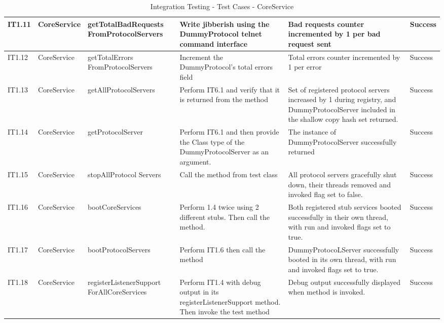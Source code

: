 \begin{table}[ht!]
\begin{tabular}{|m{0.5cm}|m{1.5cm}|m{1.5cm}|m{3cm}|m{3cm}|m{1.5cm}|}
IT1.11 & CoreService & getTotalBadRequests FromProtocolServers & Write jibberish using the DummyProtocol telnet command interface & Bad requests counter incremented by 1 per bad request sent & Success \\ \hline
IT1.12 & CoreService & getTotalErrors FromProtocolServers & Increment the DummyProtocol's total errors field & Total errors counter incremented by 1 per error & Success \\ \hline
IT1.13 & CoreService & getAllProtocolServers & Perform IT6.1 and verify that it is returned from the method & Set of registered protocol servers increased by 1 during registry, and DummyProtocolServer included in the shallow copy hash set returned. & Success \\ \hline
IT1.14 & CoreService & getProtocolServer & Perform IT6.1 and then provide the Class type of the DummyProtocolServer as an argument. & The instance of DummyProtocolServer successfully returned & Success \\ \hline
IT1.15 & CoreService & stopAllProtocol Servers & Call the method from test class & All protocol servers gracefully shut down, their threads removed and invoked flag set to false. & Success \\ \hline
IT1.16 & CoreService & bootCoreServices & Perform 1.4 twice using 2 different stubs. Then call the method. & Both registered stub services booted successfully in their own thread, with run and invoked flags set to true. & Success \\ \hline
IT1.17 & CoreService & bootProtocolServers & Perform IT1.6 then call the method & DummyProtocoLServer successfully booted in its own thread, with run and invoked flags set to true. & Success \\ \hline
IT1.18 & CoreService & registerListenerSupport ForAllCoreServices & Perform IT1.4 with debug output in its registerListenerSupport method. Then invoke the test method & Debug output successfully displayed when method is invoked. & Success \\ \hline
\end{tabular}
\caption{Integration Testing - Test Cases - CoreService}
\label{table:integration-testing-cases}
\end{table}

\clearpage

